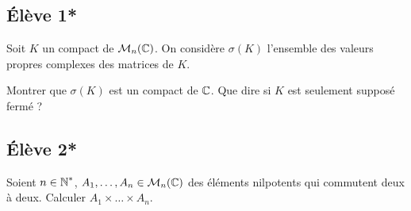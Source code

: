 \documentclass[10pt]{scrartcl}
\title{}
\author{}
\date{}
\begin{document}
    \subsection*{Élève 1*}
    \begin{exo}[ENS 2014]
        Soit $K$ un compact de $\mathcal M_n(\operatorname{\mathbb C})$. 
        On considère $\sigma(K)$ l'ensemble des valeurs propres complexes des 
        matrices de $K$. 

        Montrer que $\sigma(K)$ est un compact de $\operatorname{\mathbb C}$. 
        Que dire si $K$ est seulement supposé fermé ?
    \end{exo}

    \subsection*{Élève 2*}
    \begin{exo}
       Soient $n\in\operatorname{\mathbb N}^*$, $A_1,\dots,A_n\in\mathcal M_n(\operatorname{\mathbb C})$ des éléments nilpotents qui
       commutent deux à deux. 
       Calculer $A_1\times\dots\times A_n$.
    \end{exo}
\end{document}

